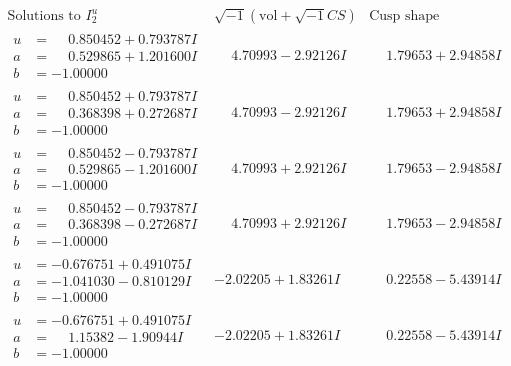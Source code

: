 \documentclass[1p]{elsarticle_modified}
\theoremstyle{definition}
\newcommand{\I}{\sqrt{-1}}
\begin{document}
$$\begin{array}{c|c|c}  
\text{Solutions to }I^u_{2}& \I (\text{vol} + \sqrt{-1}CS) & \text{Cusp shape}\\
 \hline 
\begin{aligned}
u &= \phantom{-}0.850452 + 0.793787 I \\
a &= \phantom{-}0.529865 + 1.201600 I \\
b &= -1.00000\phantom{ +0.000000I}\end{aligned}
 & \phantom{-}4.70993 - 2.92126 I & \phantom{-}1.79653 + 2.94858 I \\ \hline\begin{aligned}
u &= \phantom{-}0.850452 + 0.793787 I \\
a &= \phantom{-}0.368398 + 0.272687 I \\
b &= -1.00000\phantom{ +0.000000I}\end{aligned}
 & \phantom{-}4.70993 - 2.92126 I & \phantom{-}1.79653 + 2.94858 I \\ \hline\begin{aligned}
u &= \phantom{-}0.850452 - 0.793787 I \\
a &= \phantom{-}0.529865 - 1.201600 I \\
b &= -1.00000\phantom{ +0.000000I}\end{aligned}
 & \phantom{-}4.70993 + 2.92126 I & \phantom{-}1.79653 - 2.94858 I \\ \hline\begin{aligned}
u &= \phantom{-}0.850452 - 0.793787 I \\
a &= \phantom{-}0.368398 - 0.272687 I \\
b &= -1.00000\phantom{ +0.000000I}\end{aligned}
 & \phantom{-}4.70993 + 2.92126 I & \phantom{-}1.79653 - 2.94858 I \\ \hline\begin{aligned}
u &= -0.676751 + 0.491075 I \\
a &= -1.041030 - 0.810129 I \\
b &= -1.00000\phantom{ +0.000000I}\end{aligned}
 & -2.02205 + 1.83261 I & \phantom{-}0.22558 - 5.43914 I \\ \hline\begin{aligned}
u &= -0.676751 + 0.491075 I \\
a &= \phantom{-}1.15382 - 1.90944 I \\
b &= -1.00000\phantom{ +0.000000I}\end{aligned}
 & -2.02205 + 1.83261 I & \phantom{-}0.22558 - 5.43914 I \\ \hline\begin{aligned}

\end{aligned}
\end{array}$$
\end{document}

